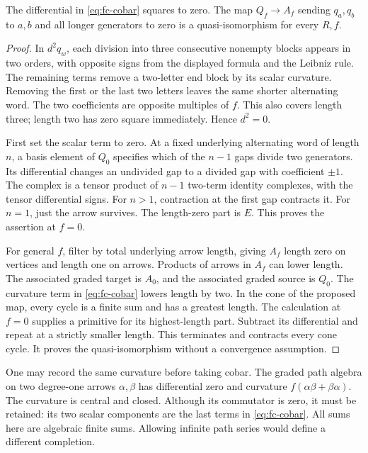 \begin{proposition}\label{prop:fc-cobar}
The differential in \eqref{eq:fc-cobar} squares to zero. The map
\(Q_f\to A_f\) sending \(q_a,q_b\) to \(a,b\) and all longer
generators to zero is a quasi-isomorphism for every \(R,f\).
\end{proposition}
\begin{proof}
In \(d^2q_w\), each division into three consecutive nonempty blocks
appears in two orders, with opposite signs from the displayed formula
and the Leibniz rule. The remaining terms remove a two-letter end block
by its scalar curvature. Removing the first or the last two letters
leaves the same shorter alternating word. The two coefficients are
opposite multiples of \(f\). This also covers length three; length two
has zero square immediately. Hence \(d^2=0\).

First set the scalar term to zero. At a fixed underlying alternating
word of length \(n\), a basis element of \(Q_0\) specifies which of
the \(n-1\) gaps divide two generators. Its differential changes an
undivided gap to a divided gap with coefficient \(\pm1\).
The complex is a tensor product of \(n-1\) two-term identity complexes,
with the tensor differential signs. For \(n>1\), contraction at the
first gap contracts it. For \(n=1\), just the arrow survives. The
length-zero part is \(E\). This proves the assertion at \(f=0\).

For general \(f\), filter by total underlying arrow length, giving
\(A_f\) length zero on vertices and length one on arrows. Products
of arrows in \(A_f\) can lower length. The associated graded target
is \(A_0\), and the associated graded source is \(Q_0\).
The curvature term in \eqref{eq:fc-cobar} lowers length by two.
In the cone of the proposed map, every cycle is a finite sum and has
a greatest length. The calculation at \(f=0\) supplies a primitive for
its highest-length part. Subtract its differential and repeat at a
strictly smaller length. This terminates and contracts every cone
cycle. It proves the quasi-isomorphism without a convergence assumption.
\end{proof}

One may record the same curvature before taking cobar. The graded path
algebra on two degree-one arrows \(\alpha,\beta\) has differential
zero and curvature \(f(\alpha\beta+\beta\alpha)\).
The curvature is central and closed. Although its commutator is zero,
it must be retained: its two scalar components are the last terms in
\eqref{eq:fc-cobar}. All sums here are algebraic finite sums. Allowing
infinite path series would define a different completion.

